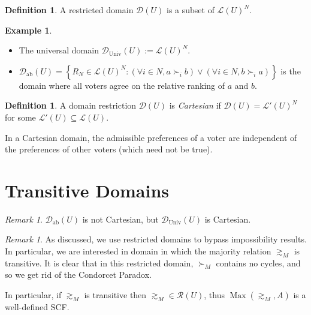 \documentclass{book}
\theoremstyle{plain}
\theoremstyle{definition}
\newtheorem{definition}[theorem]{Definition}
\newtheorem{example}[theorem]{Example}
\theoremstyle{remark}
\newtheorem{remark}[theorem]{Remark}
\newtheorem*{comment}{Comment}
\newcommand{\set}[1]{\left\{#1\right\}}
\begin{document}
\begin{definition}
    A restricted domain $\mathcal{D}(U)$ is 
    a subset of $\mathcal{L}(U)^N$.
\end{definition}
\begin{example}
    \leavevmode \\
    \begin{itemize}
        \item The universal domain $\mathcal{D}_{\text{Univ}}(U) := \mathcal{L}(U)^N$.
        \item $\mathcal{D}_{\text{ab}}(U) = \set{R_N \in \mathcal{L}(U)^N : (\forall i \in N, a \succ_i b) \lor (\forall i \in N, b \succ_i a)}$
        is the domain where all voters agree on the relative ranking of $a$ and $b$.
    \end{itemize}
\end{example}

\begin{definition}
    A domain restriction $\mathcal{D}(U)$ is 
    \emph{Cartesian} if 
    $\mathcal{D}(U) = \mathcal{L}'(U)^N$ for some 
    $\mathcal{L}'(U) \subseteq \mathcal{L}(U)$.

    In a Cartesian domain, 
    the admissible preferences of a voter are independent of 
    the preferences of other voters (which need not be true).
\end{definition}

\section{Transitive Domains}

\begin{remark}
    $\mathcal{D}_\text{ab}(U)$ is not Cartesian,
    but $\mathcal{D}_\text{Univ}(U)$ is Cartesian.
\end{remark}

\begin{remark}
    As discussed, we use restricted domains to 
    bypass impossibility results. In particular, 
    we are interested in domain in which the majority
    relation $\gtrsim_M$ is transitive.
    It is clear that in this restricted domain, 
    $\succ_M$ contains no cycles, and so 
    we get rid of the Condorcet Paradox.

    In particular, 
    if $\gtrsim_M$ is transitive
    then $\gtrsim_M \in \mathcal{R}(U)$, thus 
    $\operatorname{Max}(\gtrsim_M, A)$ is a well-defined SCF.
\end{remark}

\end{document}
